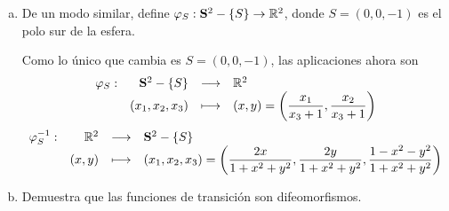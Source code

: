 \begin{ejer}
\begin{enumerate}[a)]
\begin{sol}
$$\begin{cases}
                \end{cases}$$
                y partiendo de la 3a ecuaci\'on
                $$ (1 - \lambda)^2  = 1-\lambda^2 x^2 -\lambda^2 y^2 \Rightarrow (1 - \lambda)^2  = 1-\lambda^2 (x^2 +y^2) \Rightarrow \lambda = \dfrac{2}{1 + x^2 + y^2}$$
                de forma que 
                $$\begin{cases}
                    x_1 = \dfrac{2x}{1 + x^2 + y^2} \\ x_2 = \dfrac{2y}{1 + x^2 + y^2} \\ x_3 =1-\dfrac{2}{1 + x^2 + y^2} = \dfrac{-1 + x^2 + y^2}{1 + x^2 + y^2}
                \end{cases}$$\
                teniendo as\'i definida la aplicaci\'on inversa:
                 $$\begin{array}{rrcl}
                     \varphi_N^{-1} : & \mathbb R^2 & \longrightarrow & \bold{S}^2  \\
                     &(x,y) & \longmapsto & (x_1,x_2,x_3) = \left( \dfrac{2x}{1 + x^2 + y^2} , \dfrac{2y}{1 + x^2 + y^2}, \dfrac{-1 + x^2 + y^2}{1 + x^2 + y^2}\right)
                \end{array}$$
            \end{sol}
            \item De un modo similar, define $\varphi_S: \bold S^2 - \{S\} \to \mathbb R^2$, donde $S=(0,0,-1)$ es el polo sur de la esfera.
            \begin{sol}
                Como lo \'unico que cambia es $S=(0,0,-1)$, las aplicaciones ahora son
                $$\begin{array}{rrcl}
                     \varphi_S : & \bold S^2 - \{S\} & \longrightarrow & \mathbb R^2  \\
                     &(x_1,x_2,x_3) & \longmapsto & (x,y)=\left( \dfrac{x_1}{x_3+1}, \dfrac{x_2}{x_3+1}\right) 
                \end{array}$$ 
                $$\begin{array}{rrcl}
                     \varphi_S^{-1} : & \mathbb R^2 & \longrightarrow & \bold S^2 - \{S\}  \\
                     & (x,y) & \longmapsto & (x_1,x_2,x_3) = \left( \dfrac{2x}{1 + x^2 + y^2} , \dfrac{2y}{1 + x^2 + y^2}, \dfrac{1 - x^2 - y^2}{1 + x^2 + y^2}\right)
                \end{array}$$
            \end{sol}
            \item Demuestra que las funciones de transici\'on son difeomorfismos.

\end{enumerate}
\end{ejer}

